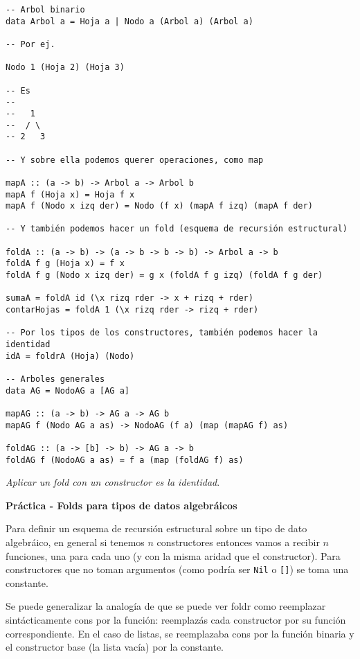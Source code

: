 \documentclass{report}
\theoremstyle{definition} %
\newenvironment{nota}[1]
    {\begin{leftbar}\textbf{#1}}
    {\end{leftbar}}
\begin{document}
\begin{verbatim}
-- Arbol binario
data Arbol a = Hoja a | Nodo a (Arbol a) (Arbol a)

-- Por ej.

Nodo 1 (Hoja 2) (Hoja 3)

-- Es
--
--   1
--  / \
-- 2   3

-- Y sobre ella podemos querer operaciones, como map

mapA :: (a -> b) -> Arbol a -> Arbol b
mapA f (Hoja x) = Hoja f x
mapA f (Nodo x izq der) = Nodo (f x) (mapA f izq) (mapA f der)

-- Y también podemos hacer un fold (esquema de recursión estructural)

foldA :: (a -> b) -> (a -> b -> b -> b) -> Arbol a -> b
foldA f g (Hoja x) = f x
foldA f g (Nodo x izq der) = g x (foldA f g izq) (foldA f g der)

sumaA = foldA id (\x rizq rder -> x + rizq + rder)
contarHojas = foldA 1 (\x rizq rder -> rizq + rder)

-- Por los tipos de los constructores, también podemos hacer la identidad
idA = foldrA (Hoja) (Nodo)

-- Arboles generales
data AG = NodoAG a [AG a]

mapAG :: (a -> b) -> AG a -> AG b
mapAG f (Nodo AG a as) -> NodoAG (f a) (map (mapAG f) as)

foldAG :: (a -> [b] -> b) -> AG a -> b
foldAG f (NodoAG a as) = f a (map (foldAG f) as)
\end{verbatim}

\textit{Aplicar un fold con un constructor es la identidad}.

\begin{nota}{Práctica - Folds para tipos de datos algebráicos}

    Para definir un esquema de recursión estructural sobre un tipo de dato
    algebráico, en general si tenemos $n$ constructores entonces vamos a recibir
    $n$ funciones, una para cada uno (y con la misma aridad que el constructor).
    Para constructores que no toman argumentos (como podría ser \texttt{Nil} o \texttt{[]}) se
    toma una constante.

    Se puede generalizar la analogía de que se puede ver foldr como reemplazar
    sintácticamente cons por la función: reemplazás cada constructor por su
    función correspondiente. En el caso de listas, se reemplazaba cons por la
    función binaria y el constructor base (la lista vacía) por la constante.
\end{nota}
\end{document}

